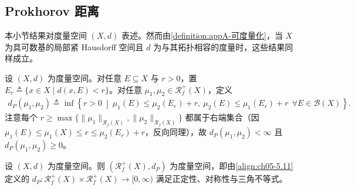 \documentclass[../../main.tex]{subfiles}%
\begin{document}
\subsection{Prokhorov 距离}\label{subsection:ch05-Prokhorov距离}

本小节结果对度量空间 $(X,d)$ 表述。然而由\cref{definition:appA-可度量化}，当 $X$ 为具可数基的局部紧 Hausdorff 空间且 $d$ 为与其拓扑相容的度量时，这些结果同样成立。

设 $(X,d)$ 为度量空间。对任意 $E\subseteq X$ 与 $r>0$，置 $E_r\triangleq \{x\in X\mid d(x,E)<r\}$。对任意 $\mu_1,\mu_2\in\mathscr{R}^+_f(X)$，定义
\begin{align}
d_P(\mu_1,\mu_2)\triangleq \inf\left\{r>0\ \middle|\
\mu_1(E)\leqslant\mu_2(E_r)+r,\ \mu_2(E)\leqslant\mu_1(E_r)+r
\ \ \forall E\in\mathscr{B}(X)\right\}.\label{align:ch05-5.11}
\end{align}
注意每个 $r\geqslant\max\{\|\mu_1\|_{\mathscr{R}_f(X)},\|\mu_2\|_{\mathscr{R}_f(X)}\}$ 都属于右端集合（因 $\mu_1(E)\leqslant\mu_1(X)\leqslant r\leqslant\mu_2(E_r)+r$，反向同理），故 $d_P(\mu_1,\mu_2)<\infty$ 且 $d_P(\mu_1,\mu_2)\geqslant0$。

\begin{proposition}\label{proposition:ch05-Prokhorov度量}
设 $(X,d)$ 为度量空间。则 $(\mathscr{R}^+_f(X),d_P)$ 为度量空间，即由\eqref{align:ch05-5.11}定义的 $d_P:\mathscr{R}^+_f(X)\times\mathscr{R}^+_f(X)\to[0,\infty)$ 满足正定性、对称性与三角不等式。
\end{proposition}
\end{document}
